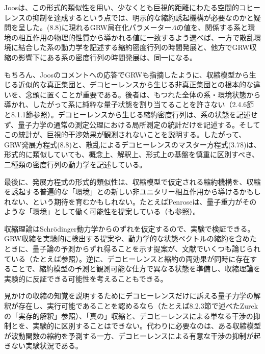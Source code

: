 Joos\cite{ref471}は、この形式的類似性を用い、少なくとも巨視的距離にわたる空間的コヒーレンスの抑制を達成するという点では、明示的な縮約誘起機構が必要なのかと疑問を呈した。(8.8)に現れるGRW局在化パラメーター$\Lambda$の値を、関係する系と環境の相互作用の物理的性質から導かれる値に一致するよう選べば、一方で散乱環境に結合した系の動力学を記述する縮約密度行列の時間発展と、他方でGRW収縮の影響下にある系の密度行列の時間発展は、同一になる。


\hypertarget{srcpage:353}{}\label{srcpage:353}
もちろん、Joosのコメントへの応答でGRW\cite{ref445}も指摘したように、収縮模型から生じる近似的な真正集団と、デコヒーレンスから生じる非真正集団との根本的な違いを、念頭に置くことが重要である。後者は、もつれた全体の系・環境状態から導かれ、したがって系に純粋な量子状態を割り当てることを許さない（2.4.6節と8.1.1節参照）。デコヒーレンスから生じる縮約密度行列は、系の状態を記述せず、量子力学の通常の測定公理における局所測定の統計だけを記述する。そしてこの統計が、巨視的干渉効果が観測されないことを説明する。したがって、GRW発展方程式(8.8)と、散乱によるデコヒーレンスのマスター方程式(3.78)は、形式的に類似していても、概念上、解釈上、形式上の基盤を慎重に区別すべき、二種類の密度行列の動力学を記述している。

最後に、発展方程式の形式的類似性は、収縮模型で仮定される縮約機構を、収縮を誘起する普遍的な「環境」との新しい非ユニタリー相互作用から導けるかもしれない、という期待を育むかもしれない。たとえばPenrose\cite{ref472,ref473}は、量子重力がそのような「環境」として働く可能性を提案している（\cite{ref449,ref453}も参照）。

収縮理論はSchrödinger動力学からのずれを仮定するので、実験で検証できる。GRW収縮を実験的に検出する提案や、動力学的な状態ベクトルの縮約を含めたときに、量子論の予測からずれ得ることを示す提案が、文献でいくつも論じられている（たとえば\cite{ref464,ref474,ref475,ref476,ref477}参照）。逆に、デコヒーレンスと縮約の両効果が同時に存在することで、縮約模型の予測と観測可能な仕方で異なる状態を準備し、収縮理論を実験的に反証できる可能性を考えることもできる。

見かけの収縮の知覚を説明するためにデコヒーレンスだけに訴える量子力学の解釈が存在し、実行可能であることを認めるなら（たとえば8.2.3節で述べたZurekの「実存的解釈」\cite{ref084,ref104}参照）、「真の」収縮と、デコヒーレンスによる単なる干渉の抑制とを、実験的に区別することはできない。代わりに必要なのは、ある収縮模型が波動関数の縮約を予測する一方、デコヒーレンスによる有意な干渉の抑制が起きない実験状況である。


